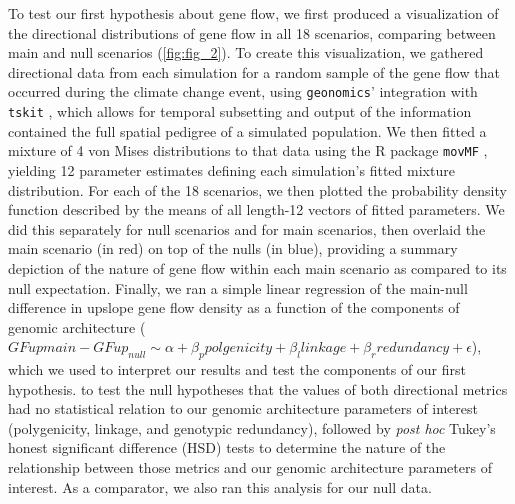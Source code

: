 \documentclass[9pt,twocolumn,twoside,lineno]{pnas-new}
\begin{document}
{To test our first hypothesis about gene flow,
we first produced a visualization of the directional 
distributions of gene flow in all 18 scenarios, comparing between main
and null scenarios (\ref{fig:fig_2}).
To create this visualization, we gathered directional data
from each simulation for a random 
sample of the gene flow that occurred during the climate change event, using 
\texttt{geonomics}' integration with \texttt{tskit} \cite{kelleher}, which allows for temporal 
subsetting and output of the information contained the full spatial pedigree of a 
simulated population. We then fitted a mixture of 4 von Mises distributions to that data
using the R package \texttt{movMF} \cite{hornik},
yielding 12 parameter estimates defining each simulation's fitted mixture distribution. For each of 
the 18 scenarios, we then plotted the probability density function 
described by the means of all length-12 vectors of fitted parameters. We did this 
separately for null scenarios and for main scenarios, then overlaid the main scenario (in red)
on top of the nulls (in blue), providing a summary depiction of the nature of gene flow within each 
main scenario as compared to its null expectation.
Finally, we ran a simple linear regression
of the main-null difference in upslope gene flow density
as a function of the components of genomic architecture
($GFup{main}-GFup_{null} \sim \alpha + \beta_{p}polgenicity + \beta_{l}linkage + \beta_{r}redundancy + \epsilon$),
which we used to interpret our results and test the components of our first hypothesis.
to test the null hypotheses that the values of both directional metrics
had no statistical relation to our genomic architecture parameters
of interest (polygenicity, linkage, and genotypic redundancy),
followed by \textit{post hoc} Tukey's honest significant difference (HSD) tests
to determine the nature of the relationship between those metrics and our
genomic architecture parameters of interest.
As a comparator, we also ran this analysis for our null data.

}
\end{document}
